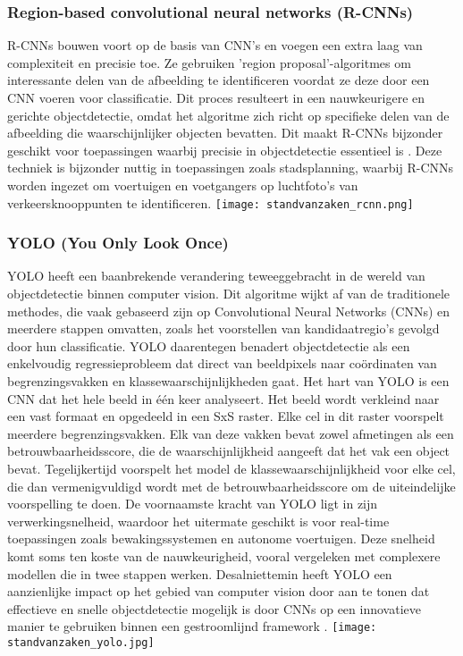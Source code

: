 \subsubsection{Region-based convolutional neural networks (R-CNNs)}
R-CNNs bouwen voort op de basis van CNN's en voegen een extra laag van complexiteit en precisie toe. Ze gebruiken 'region proposal'-algoritmes om interessante delen van de afbeelding te identificeren voordat ze deze door een CNN voeren voor classificatie. Dit proces resulteert in een nauwkeurigere en gerichte objectdetectie, omdat het algoritme zich richt op specifieke delen van de afbeelding die waarschijnlijker objecten bevatten. Dit maakt R-CNNs bijzonder geschikt voor toepassingen waarbij precisie in objectdetectie essentieel is \autocite{zhang2014part}.
Deze techniek is bijzonder nuttig in toepassingen zoals stadsplanning, waarbij R-CNNs worden ingezet om voertuigen en voetgangers op luchtfoto's van verkeersknooppunten te identificeren.
\newline
\texttt{[image: standvanzaken\_rcnn.png]}
\newline
\subsubsection{YOLO (You Only Look Once)}
YOLO heeft een baanbrekende verandering teweeggebracht in de wereld van objectdetectie binnen computer vision. Dit algoritme wijkt af van de traditionele methodes, die vaak gebaseerd zijn op Convolutional Neural Networks (CNNs) en meerdere stappen omvatten, zoals het voorstellen van kandidaatregio's gevolgd door hun classificatie. YOLO daarentegen benadert objectdetectie als een enkelvoudig regressieprobleem dat direct van beeldpixels naar coördinaten van begrenzingsvakken en klassewaarschijnlijkheden gaat.
\newline
Het hart van YOLO is een CNN dat het hele beeld in één keer analyseert. Het beeld wordt verkleind naar een vast formaat en opgedeeld in een SxS raster. Elke cel in dit raster voorspelt meerdere begrenzingsvakken. Elk van deze vakken bevat zowel afmetingen als een betrouwbaarheidsscore, die de waarschijnlijkheid aangeeft dat het vak een object bevat. Tegelijkertijd voorspelt het model de klassewaarschijnlijkheid voor elke cel, die dan vermenigvuldigd wordt met de betrouwbaarheidsscore om de uiteindelijke voorspelling te doen.
\newline
De voornaamste kracht van YOLO ligt in zijn verwerkingsnelheid, waardoor het uitermate geschikt is voor real-time toepassingen zoals bewakingssystemen en autonome voertuigen. Deze snelheid komt soms ten koste van de nauwkeurigheid, vooral vergeleken met complexere modellen die in twee stappen werken. Desalniettemin heeft YOLO een aanzienlijke impact op het gebied van computer vision door aan te tonen dat effectieve en snelle objectdetectie mogelijk is door CNNs op een innovatieve manier te gebruiken binnen een gestroomlijnd framework \autocite{diwan2023object}.
\newline
\texttt{[image: standvanzaken\_yolo.jpg]}
\newline
